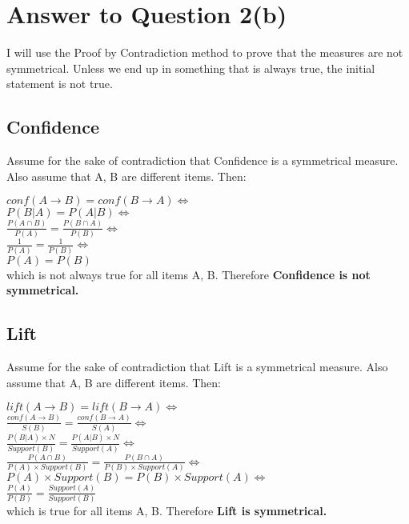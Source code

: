 \documentclass[11pt]{article}
\begin{document}
\section*{Answer to Question 2(b)}
I will use the Proof by Contradiction method to prove that the measures are not symmetrical. Unless we end up in something that is always true, the initial statement is not true.
\subsection*{Confidence}
Assume for the sake of contradiction that Confidence is a symmetrical measure. Also assume that A, B are different items. Then:\\
\begin{center}
$ conf(A \rightarrow B) =  conf(B \rightarrow A) \Leftrightarrow$ \\
$ P(B|A) = P(A|B) \Leftrightarrow$\\
$ \frac{P(A\cap B)}{P(A)} = \frac{P(B\cap A)}{P(B)}   \Leftrightarrow$\\
$  \frac{1}{P(A)} = \frac{1}{P(B)}\Leftrightarrow$\\
$ P(A) = P(B) $\\
which is not always true for all items A, B. Therefore \textbf{Confidence is not symmetrical.}
\end{center}
\subsection*{Lift}
Assume for the sake of contradiction that Lift is a symmetrical measure. Also assume that A, B are different items. Then:\\
\begin{center}
$ lift(A \rightarrow B) =  lift(B \rightarrow A) \Leftrightarrow$ \\
$ \frac{conf(A \rightarrow B)}{S(B)} =  \frac{conf(B \rightarrow A)}{S(A)} \Leftrightarrow$ \\
$ \frac{P(B|A)\times N}{Support(B)} =  \frac{P(A|B)\times N}{Support(A)} \Leftrightarrow$ \\
$ \frac{P(A\cap B)}{P(A)\times Support(B)} = \frac{P(B\cap A)}{P(B)\times Support(A)}   \Leftrightarrow$\\
$ P(A)\times Support(B) = P(B)\times Support(A) \Leftrightarrow$\\
$ \frac{P(A)}{P(B)} = \frac{Support(A)}{Support(B)}$\\
which is true for all items A, B. Therefore \textbf{Lift is symmetrical.}
\end{center}
\end{document}
